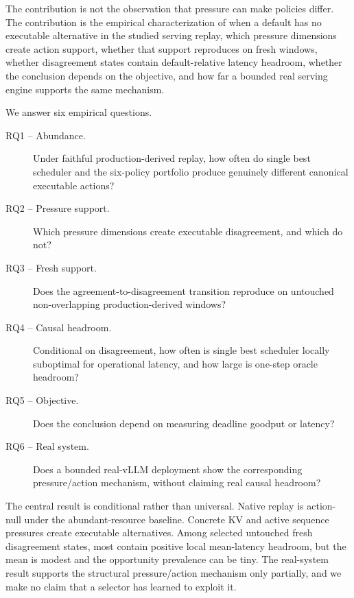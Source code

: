 \documentclass[preprint,12pt]{elsarticle}
\begin{document}
The contribution is not the observation that pressure can make policies
differ. The contribution is the empirical characterization of when a default
has no executable alternative in the studied serving replay, which pressure
dimensions create action support, whether that support reproduces on fresh
windows, whether disagreement states contain default-relative latency
headroom, whether the conclusion depends on the objective, and how far a
bounded real serving engine supports the same mechanism.

We answer six empirical questions.
\begin{description}
\item[RQ1 -- Abundance.] Under faithful production-derived replay,
how often do single best scheduler and the six-policy portfolio produce genuinely different canonical
executable actions?
\item[RQ2 -- Pressure support.] Which pressure dimensions create executable
disagreement, and which do not?
\item[RQ3 -- Fresh support.] Does the agreement-to-disagreement transition
reproduce on untouched non-overlapping production-derived windows?
\item[RQ4 -- Causal headroom.] Conditional on disagreement, how often is single best scheduler
locally suboptimal for operational latency, and how large is one-step oracle
headroom?
\item[RQ5 -- Objective.] Does the conclusion depend on measuring
deadline goodput or latency?
\item[RQ6 -- Real system.] Does a bounded real-vLLM deployment show
the corresponding pressure/action mechanism, without claiming real causal
headroom?
\end{description}

The central result is conditional rather than universal. Native replay is
action-null under the abundant-resource baseline. Concrete KV and active
sequence pressures create executable alternatives. Among selected untouched
fresh disagreement states, most contain positive local mean-latency
headroom, but the mean is modest and the opportunity prevalence can be tiny.
The real-system result supports the structural pressure/action mechanism only
partially, and we make no claim that a selector has learned to exploit it.
\end{document}
